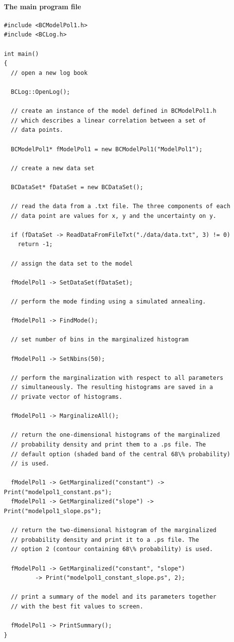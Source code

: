 \documentclass[11pt, a4paper]{article}
\begin{document}
\pagebreak 

\paragraph{The main program file} 
% 
\begin{small} 
\begin{verbatim}
#include <BCModelPol1.h>
#include <BCLog.h> 

int main()
{
  // open a new log book 

  BCLog::OpenLog(); 

  // create an instance of the model defined in BCModelPol1.h 
  // which describes a linear correlation between a set of 
  // data points. 

  BCModelPol1* fModelPol1 = new BCModelPol1("ModelPol1"); 

  // create a new data set 

  BCDataSet* fDataSet = new BCDataSet(); 

  // read the data from a .txt file. The three components of each 
  // data point are values for x, y and the uncertainty on y. 

  if (fDataSet -> ReadDataFromFileTxt("./data/data.txt", 3) != 0)
    return -1; 

  // assign the data set to the model 

  fModelPol1 -> SetDataSet(fDataSet); 

  // perform the mode finding using a simulated annealing. 

  fModelPol1 -> FindMode(); 

  // set number of bins in the marginalized histogram 

  fModelPol1 -> SetNbins(50);

  // perform the marginalization with respect to all parameters 
  // simultaneously. The resulting histograms are saved in a 
  // private vector of histograms. 

  fModelPol1 -> MarginalizeAll();

  // return the one-dimensional histograms of the marginalized 
  // probability density and print them to a .ps file. The 
  // default option (shaded band of the central 68\% probability) 
  // is used. 

  fModelPol1 -> GetMarginalized("constant") -> Print("modelpol1_constant.ps");
  fModelPol1 -> GetMarginalized("slope") -> Print("modelpol1_slope.ps");

  // return the two-dimensional histogram of the marginalized 
  // probability density and print it to a .ps file. The 
  // option 2 (contour containing 68\% probability) is used. 

  fModelPol1 -> GetMarginalized("constant", "slope") 
	     -> Print("modelpol1_constant_slope.ps", 2);

  // print a summary of the model and its parameters together 
  // with the best fit values to screen. 

  fModelPol1 -> PrintSummary(); 
} 
\end{verbatim} 
\end{small} 
\end{document}
